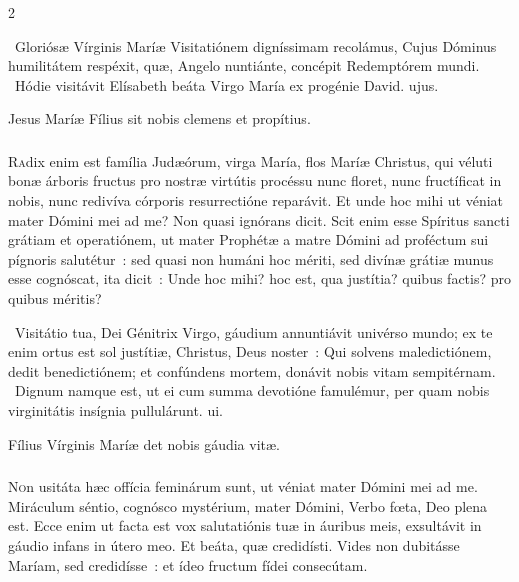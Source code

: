\documentclass[9pt,twoside]{extarticle}
\begin{document}
\begin{multicols}{2}
{{\begin{tightlist}{}
\item {}~Gloriósæ Vírginis Maríæ Visitatiónem digníssimam recolámus, \textred{*} Cujus Dóminus humilitátem respéxit, quæ, Angelo nuntiánte, concépit Redemptórem mundi. ~Hódie visitávit Elísabeth beáta Virgo María ex progénie David. ujus.
\item {} Jesus Maríæ Fílius sit nobis clemens et propítius.
\end{tightlist}

\subsubsection*{\center {}}
\lettrine{R}adix enim est família Judæórum, virga María, flos Maríæ Christus, qui véluti bonæ árboris fructus pro nostræ virtútis procéssu nunc floret, nunc fructíficat in nobis, nunc redivíva córporis resurrectióne reparávit. Et unde hoc mihi ut véniat mater Dómini mei ad me? Non quasi ignórans dicit. Scit enim esse Spíritus sancti grátiam et operatiónem, ut mater Prophétæ a matre Dómini ad proféctum sui pígnoris salutétur~: sed quasi non humáni hoc mériti, sed divínæ grátiæ munus esse cognóscat, ita dicit~: Unde hoc mihi? hoc est, qua justítia? quibus factis? pro quibus méritis?

\begin{tightlist}{}
\item {}~Visitátio tua, Dei Génitrix Virgo, gáudium annuntiávit univérso mundo; ex te enim ortus est sol justítiæ, Christus, Deus noster~: \textred{*} Qui solvens maledictiónem, dedit benedictiónem; et confúndens mortem, donávit nobis vitam sempitérnam. ~Dignum namque est, ut ei cum summa devotióne famulémur, per quam nobis virginitátis insígnia pullulárunt. ui.
\item {} Fílius Vírginis Maríæ det nobis gáudia vitæ.
\end{tightlist}

\subsubsection*{\center {}}
\lettrine{N}on usitáta hæc offícia feminárum sunt, ut véniat mater Dómini mei ad me. Miráculum séntio, cognósco mystérium, mater Dómini, Verbo fœta, Deo plena est. Ecce enim ut facta est vox salutatiónis tuæ in áuribus meis, exsultávit in gáudio infans in útero meo. Et beáta, quæ credidísti. Vides non dubitásse Maríam, sed credidísse~: et ídeo fructum fídei consecútam.

}}
\end{multicols}
\end{document}
